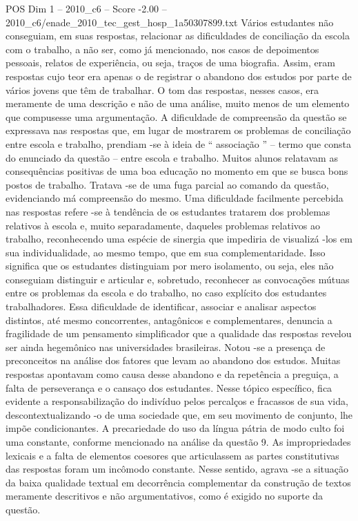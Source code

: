 \begin{textsample}{POS Dim 1 – 2010\_c6 – Score -2.00 – 2010\_c6/enade\_2010\_tec\_gest\_hosp\_1a50307899.txt}
Vários estudantes não conseguiam, em suas respostas, relacionar as dificuldades de conciliação da escola com o trabalho, a não ser, como já mencionado, nos casos de depoimentos pessoais, relatos de experiência, ou seja, traços de uma biografia.
Assim, eram respostas cujo teor era apenas o de registrar o abandono dos estudos por parte de vários jovens que têm de trabalhar.
O tom das respostas, nesses casos, era meramente de uma descrição e não de uma análise, muito menos de um elemento que compusesse uma argumentação.
A dificuldade de compreensão da questão se expressava nas respostas que, em lugar de mostrarem os problemas de conciliação entre escola e trabalho, prendiam -se à ideia de “ associação ” – termo que consta do enunciado da questão – entre escola e trabalho.
Muitos alunos relatavam as consequências positivas de uma boa educação no momento em que se busca bons postos de trabalho.
Tratava -se de uma fuga parcial ao comando da questão, evidenciando má compreensão do mesmo.
Uma dificuldade facilmente percebida nas respostas refere -se à tendência de os estudantes tratarem dos problemas relativos à escola e, muito separadamente, daqueles problemas relativos ao trabalho, reconhecendo uma espécie de sinergia que impediria de visualizá -los em sua individualidade, ao mesmo tempo, que em sua complementaridade.
Isso significa que os estudantes distinguiam por mero isolamento, ou seja, eles não conseguiam distinguir e articular e, sobretudo, reconhecer as convocações mútuas entre os problemas da escola e do trabalho, no caso explícito dos estudantes trabalhadores.
Essa dificuldade de identificar, associar e analisar aspectos distintos, até mesmo concorrentes, antagônicos e complementares, denuncia a fragilidade de um pensamento simplificador que a qualidade das respostas revelou ser ainda hegemônico nas universidades brasileiras.
Notou -se a presença de preconceitos na análise dos fatores que levam ao abandono dos estudos.
Muitas respostas apontavam como causa desse abandono e da repetência a preguiça, a falta de perseverança e o cansaço dos estudantes.
Nesse tópico específico, fica evidente a responsabilização do indivíduo pelos percalços e fracassos de sua vida, descontextualizando -o de uma sociedade que, em seu movimento de conjunto, lhe impõe condicionantes.
A precariedade do uso da língua pátria de modo culto foi uma constante, conforme mencionado na análise da questão 9.
As impropriedades lexicais e a falta de elementos coesores que articulassem as partes constitutivas das respostas foram um incômodo constante.
Nesse sentido, agrava -se a situação da baixa qualidade textual em decorrência complementar da construção de textos meramente descritivos e não argumentativos, como é exigido no suporte da questão.

\end{textsample}
